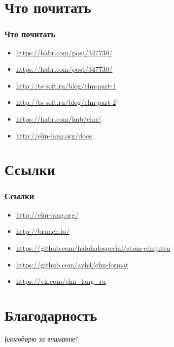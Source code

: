 \documentclass[11pt,aspectratio=169]{beamer}
\begin{document}
\section{Что почитать}

\begin{frame}
\frametitle{Что почитать}
\begin{itemize}
	\item \url{https://habr.com/post/347730/}
	\item \url{https://habr.com/post/347730/}
	\item \url{http://ts-soft.ru/blog/elm-part-1}
	\item \url{http://ts-soft.ru/blog/elm-part-2}
	\item \url{https://habr.com/hub/elm/}
	\item \url{http://elm-lang.org/docs}
\end{itemize}
\end{frame}

\section{Ссылки}

\begin{frame}
\frametitle{Ссылки}
\begin{itemize}
\item \url{http://elm-lang.org/}
\item \url{http://brunch.io/}
\item \url{https://github.com/halohalospecial/atom-elmjutsu}
\item \url{https://github.com/avh4/elm-format}
\item \url{https://vk.com/elm_lang_ru}
\end{itemize}
\end{frame}

\section*{Благодарность}

\begin{frame}
\center

\textit{Благодарю за внимание!}

\textbf{\textsl{\inserttitle}}

\insertauthor
\end{frame}
\end{document}
